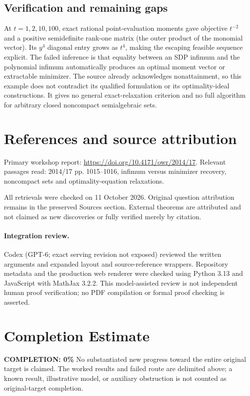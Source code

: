 \documentclass[11pt]{article}
\begin{document}
\subsection{Verification and remaining gaps}
At $t=1,2,10,100$, exact rational point-evaluation moments gave objective $t^{-2}$ and a positive semidefinite rank-one matrix (the outer product of the monomial vector). Its $y^4$ diagonal entry grows as $t^4$, making the escaping feasible sequence explicit. The failed inference is that equality between an SDP infimum and the polynomial infimum automatically produces an optimal moment vector or extractable minimizer. The source already acknowledges nonattainment, so this example does not contradict its qualified formulation or its optimality-ideal constructions. It gives no general exact-relaxation criterion and no full algorithm for arbitrary closed noncompact semialgebraic sets.

\section{References and source attribution}
Primary workshop report: \url{https://doi.org/10.4171/owr/2014/17}. Relevant passages read: 2014/17 pp. 1015--1016, infimum versus minimizer recovery, noncompact sets and optimality-equation relaxations.

All retrievals were checked on 11 October 2026. Original question attribution remains in the preserved Sources section. External theorems are attributed and not claimed as new discoveries or fully verified merely by citation.


\paragraph{Integration review.} Codex (GPT-6; exact serving revision not exposed) reviewed the written arguments and expanded layout and source-reference wrappers. Repository metadata and the production web renderer were checked using Python 3.13 and JavaScript with MathJax 3.2.2. This model-assisted review is not independent human proof verification; no PDF compilation or formal proof checking is asserted.

\section{Completion Estimate}
\noindent\textbf{COMPLETION: 0\%}
No substantiated new progress toward the entire original target is claimed. The worked results and failed route are delimited above; a known result, illustrative model, or auxiliary obstruction is not counted as original-target completion.
\end{document}
